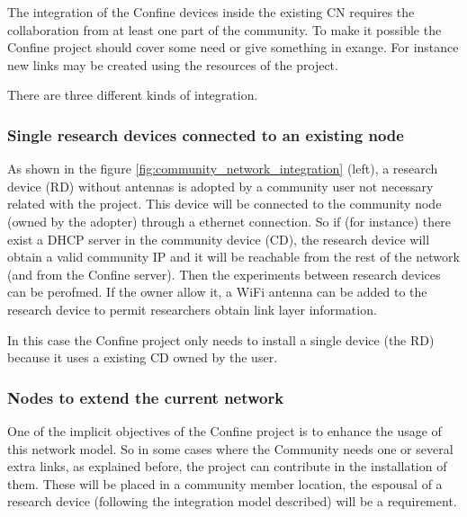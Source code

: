 \documentclass[conference]{IEEEtran}
\begin{document}
The integration of the Confine devices inside the existing CN requires the collaboration from at least
one part of the community. To make it possible the Confine project should cover some need or give 
something in exange. For instance new links may be created using the resources of the project.

There are three different kinds of integration.

\subsubsection{Single research devices connected to an existing node}
\label{sec:single-research-devices}

As shown in the figure \ref{fig:community_network_integration} (left), a research device (RD) without antennas is 
adopted by a community user not necessary related with the project.
This device will be connected to the community node (owned by the adopter) through a ethernet connection. 
So if (for instance) there exist a DHCP server in the community device (CD), the research device will obtain 
a valid community IP and it will be reachable from the rest of the network (and from the Confine server).
Then the experiments between research devices can be perofmed. If the owner allow it, a WiFi antenna can be 
added to the research device to permit researchers obtain link layer information.

In this case the Confine project only needs to install a single device (the RD) because it uses a existing
CD owned by the user. 


\subsubsection{Nodes to extend the current network}
One of the implicit objectives of the Confine project is to enhance the usage of this network model. So in 
some cases where the Community needs one or several extra links, as explained before, the project can 
contribute in the installation of them. These will be placed in a community member location,  the espousal 
of a research device (following the integration model described) will be a requirement.
\end{document}
